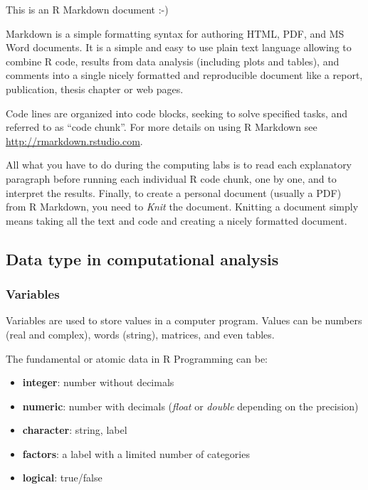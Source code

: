 \documentclass[
]{article}
\providecommand{\tightlist}{%
  \setlength{\itemsep}{0pt}\setlength{\parskip}{0pt}}
\begin{document}
This is an R Markdown document :-)

Markdown is a simple formatting syntax for authoring HTML, PDF, and MS Word documents.
It is a simple and easy to use plain text language allowing to combine R code, results from data analysis (including plots and tables), and comments into a single nicely formatted and reproducible document like a report, publication, thesis chapter or web pages.

Code lines are organized into code blocks, seeking to solve specified tasks, and referred to as ``code chunk''.
For more details on using R Markdown see \url{http://rmarkdown.rstudio.com}.

All what you have to do during the computing labs is to read each explanatory paragraph before running each individual R code chunk, one by one, and to interpret the results.
Finally, to create a personal document (usually a PDF) from R Markdown, you need to \emph{Knit} the document.
Knitting a document simply means taking all the text and code and creating a nicely formatted document.

\subsection{Data type in computational analysis}\label{data-type-in-computational-analysis}

\subsubsection{Variables}\label{variables}

Variables are used to store values in a computer program.
Values can be numbers (real and complex), words (string), matrices, and even tables.

The fundamental or atomic data in R Programming can be:

\begin{itemize}
\tightlist
\item
  \textbf{integer}: number without decimals
\item
  \textbf{numeric}: number with decimals (\emph{float} or \emph{double} depending on the precision)
\item
  \textbf{character}: string, label
\item
  \textbf{factors}: a label with a limited number of categories
\item
  \textbf{logical}: true/false
\end{itemize}
\end{document}
